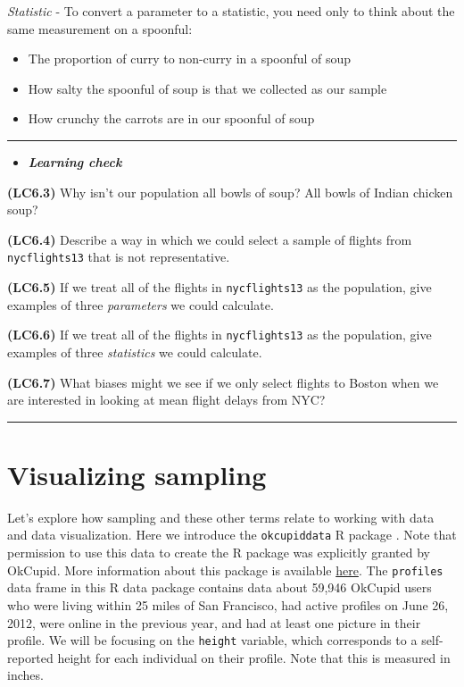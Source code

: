 \documentclass[]{tufte-book}
\let\oldrule=\rule
\renewcommand{\rule}[1]{\oldrule{\linewidth}}
\providecommand{\tightlist}{%
  \setlength{\itemsep}{0pt}\setlength{\parskip}{0pt}}
\newenvironment{rmdblock}[1]
  {\begin{shaded*}
  \begin{itemize}
  \renewcommand{\labelitemi}{
    \raisebox{-.7\height}[0pt][0pt]{
    }
  }
  \item
  }
  {
  \end{itemize}
  \end{shaded*}
  }
\newenvironment{learncheck}
  {\begin{rmdblock}{warning}}
  {\end{rmdblock}}
\begin{document}
\emph{Statistic} - To convert a parameter to a statistic, you need only
to think about the same measurement on a spoonful:

\begin{itemize}
\tightlist
\item
  The proportion of curry to non-curry in a spoonful of soup
\item
  How salty the spoonful of soup is that we collected as our sample
\item
  How crunchy the carrots are in our spoonful of soup
\end{itemize}

\begin{center}\rule{0.5\linewidth}{\linethickness}\end{center}

\begin{learncheck}
\textbf{\emph{Learning check}}
\end{learncheck}

\textbf{(LC6.3)} Why isn't our population all bowls of soup? All bowls
of Indian chicken soup?

\textbf{(LC6.4)} Describe a way in which we could select a sample of
flights from \texttt{nycflights13} that is not representative.

\textbf{(LC6.5)} If we treat all of the flights in \texttt{nycflights13}
as the population, give examples of three \emph{parameters} we could
calculate.

\textbf{(LC6.6)} If we treat all of the flights in \texttt{nycflights13}
as the population, give examples of three \emph{statistics} we could
calculate.

\textbf{(LC6.7)} What biases might we see if we only select flights to
Boston when we are interested in looking at mean flight delays from NYC?

\begin{center}\rule{0.5\linewidth}{\linethickness}\end{center}

\section{Visualizing sampling}\label{visualizing-sampling}

Let's explore how sampling and these other terms relate to working with
data and data visualization. Here we introduce the \texttt{okcupiddata}
R package \citep{R-okcupiddata}. Note that permission to use this data
to create the R package was explicitly granted by OkCupid. More
information about this package is available
\href{https://github.com/rudeboybert/okcupiddata}{here}. The
\texttt{profiles} data frame in this R data package contains data about
59,946 OkCupid users who were living within 25 miles of San Francisco,
had active profiles on June 26, 2012, were online in the previous year,
and had at least one picture in their profile. We will be focusing on
the \texttt{height} variable, which corresponds to a self-reported
height for each individual on their profile. Note that this is measured
in inches.
\end{document}
